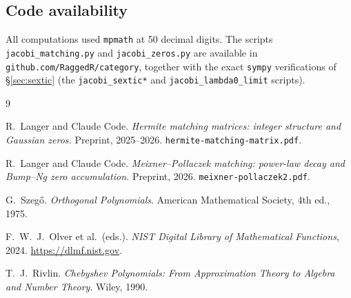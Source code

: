\documentclass[11pt,a4paper]{article}
\begin{document}
\subsection{Code availability}

All computations used \texttt{mpmath} at 50 decimal digits.
The scripts \texttt{jacobi\_matching.py} and \texttt{jacobi\_zeros.py}
are available in \texttt{github.com/RaggedR/category}, together with the
exact \texttt{sympy} verifications of \S\ref{sec:sextic}
(the \texttt{jacobi\_sextic*} and \texttt{jacobi\_lambda0\_limit} scripts).

\begin{thebibliography}{9}

R.\ Langer and Claude Code.
\emph{Hermite matching matrices: integer structure and Gaussian zeros.}
Preprint, 2025--2026. \texttt{hermite-matching-matrix.pdf}.

R.\ Langer and Claude Code.
\emph{Meixner--Pollaczek matching: power-law decay and Bump--Ng zero accumulation.}
Preprint, 2026. \texttt{meixner-pollaczek2.pdf}.

G.\ Szeg\H{o}.
\emph{Orthogonal Polynomials}.
American Mathematical Society, 4th ed., 1975.

F.\ W.\ J.\ Olver et al.\ (eds.).
\emph{NIST Digital Library of Mathematical Functions}, 2024.
\url{https://dlmf.nist.gov}.

T.\ J.\ Rivlin.
\emph{Chebyshev Polynomials: From Approximation Theory to Algebra and Number Theory}.
Wiley, 1990.

\end{thebibliography}
\end{document}
